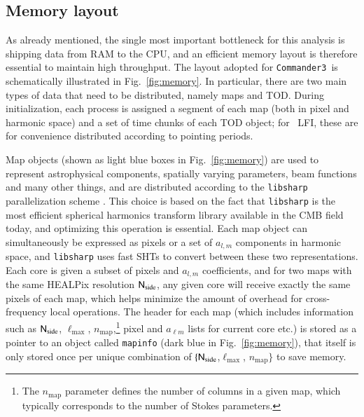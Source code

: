 \documentclass[twocolumn]{aa}
\def\commanderthree{\texttt{Commander3}}
\newcommand{\N}[0]{\tens{N}}
\begin{document}
\subsection{Memory layout}
\label{sec:mem_layout}

As already mentioned, the single most important bottleneck for this
analysis is shipping data from RAM to the CPU, and an efficient memory
layout is therefore essential to maintain high throughput. The layout
adopted for \commanderthree\ is schematically illustrated in
Fig.~\ref{fig:memory}. In particular, there are two main types of data
that need to be distributed, namely maps and TOD. During
initialization, each process is assigned a segment of each map (both
in pixel and harmonic space) and a set of time chunks of each TOD
object; for \Planck\ LFI, these are for convenience distributed
according to pointing periods.

Map objects (shown as light blue boxes in Fig.~\ref{fig:memory}) are
used to represent astrophysical components, spatially varying
parameters, beam functions and many other things, and are distributed
according to the \texttt{libsharp} parallelization scheme
\citep{libsharp}. This choice is based on the fact that
\texttt{libsharp} is the most efficient spherical harmonics transform
library available in the CMB field today, and optimizing this
operation is essential. Each map object can simultaneously be
expressed as pixels or a set of $a_{l,m}$ components in harmonic
space, and \texttt{libsharp} uses fast SHTs to convert between these
two representations. Each core is given a subset of pixels and
$a_{l,m}$ coefficients, and for two maps with the same HEALPix
resolution $\N_{\mathrm{side}}$, any given core will receive exactly
the same pixels of each map, which helps minimize the amount of
overhead for cross-frequency local operations. The header for each map
(which includes information such as $\N_{\mathrm{side}}$,
$\ell_{\mathrm{max}}$, $n_{\mathrm{map}}$,\footnote{The
  $n_{\mathrm{map}}$ parameter defines the number of columns in a
  given map, which typically corresponds to the number of Stokes
  parameters.} pixel and $a_{\ell m}$ lists for current core etc.) is
stored as a pointer to an object called \texttt{mapinfo} (dark blue in
Fig.~\ref{fig:memory}), that itself is only stored once per unique
combination of $\{\N_{\mathrm{side}}$,$\ell_{\mathrm{max}}$,
$n_{\mathrm{map}}\}$ to save memory.
\end{document}
